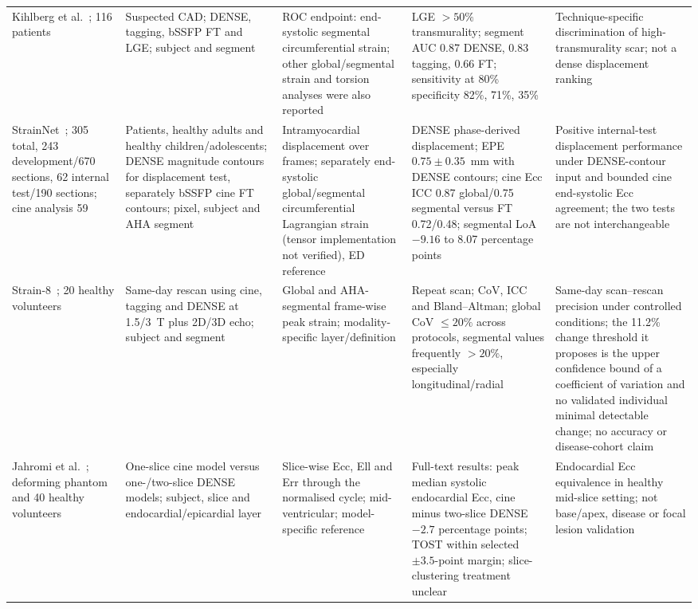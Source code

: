 \documentclass[11pt,a4paper]{article}
\begin{document}
{\begin{longtable}{L{0.139\textwidth}L{0.185\textwidth}L{0.196\textwidth}L{0.231\textwidth}L{0.173\textwidth}}
\addlinespace
Kihlberg et al.~\cite{kihlberg2020clinical}; 116 patients & Suspected CAD; DENSE, tagging, bSSFP FT and LGE; subject and segment & ROC endpoint: end-systolic segmental circumferential strain; other global/segmental strain and torsion analyses were also reported & LGE $>50\%$ transmurality; segment AUC 0.87 DENSE, 0.83 tagging, 0.66 FT; sensitivity at 80\% specificity 82\%, 71\%, 35\% & Technique-specific discrimination of high-transmurality scar; not a dense displacement ranking \\
\addlinespace
StrainNet~\cite{wang2023strainnet}; 305 total, 243 development/670 sections, 62 internal test/190 sections; cine analysis 59 & Patients, healthy adults and healthy children/adolescents; DENSE magnitude contours for displacement test, separately bSSFP cine FT contours; pixel, subject and AHA segment & Intramyocardial displacement over frames; separately end-systolic global/segmental circumferential Lagrangian strain (tensor implementation not verified), ED reference & DENSE phase-derived displacement; EPE $0.75\pm0.35$~mm with DENSE contours; cine Ecc ICC 0.87 global/0.75 segmental versus FT 0.72/0.48; segmental LoA \(-9.16\) to 8.07 percentage points & Positive internal-test displacement performance under DENSE-contour input and bounded cine end-systolic Ecc agreement; the two tests are not interchangeable \\
\addlinespace
Strain-8~\cite{bell2025strain8}; 20 healthy volunteers & Same-day rescan using cine, tagging and DENSE at 1.5/3~T plus 2D/3D echo; subject and segment & Global and AHA-segmental frame-wise peak strain; modality-specific layer/definition & Repeat scan; CoV, ICC and Bland--Altman; global CoV $\leq20\%$ across protocols, segmental values frequently $>20\%$, especially longitudinal/radial & Same-day scan--rescan precision under controlled conditions; the 11.2\% change threshold it proposes is the upper confidence bound of a coefficient of variation and no validated individual minimal detectable change; no accuracy or disease-cohort claim \\
\addlinespace
Jahromi et al.~\cite{jahromi2026densecine}; deforming phantom and 40 healthy volunteers & One-slice cine model versus one-/two-slice DENSE models; subject, slice and endocardial/epicardial layer & Slice-wise Ecc, Ell and Err through the normalised cycle; mid-ventricular; model-specific reference & Full-text results: peak median systolic endocardial Ecc, cine minus two-slice DENSE \(-2.7\) percentage points; TOST within selected \(\pm3.5\)-point margin; slice-clustering treatment unclear & Endocardial Ecc equivalence in healthy mid-slice setting; not base/apex, disease or focal lesion validation \\
\bottomrule
\end{longtable}
}
\end{document}
